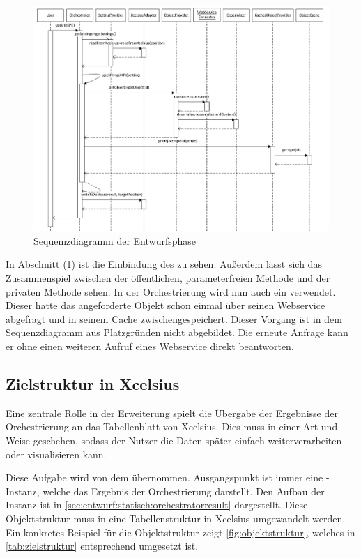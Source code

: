 \begin{onehalfspacing}
\begin{figure}[h]
\centering
\setlength{\unitlength}{1mm}
\includegraphics[width=15cm]{Visio/Entwurf-Sequenz.pdf}
\caption{Sequemzdiagramm der Entwurfsphase\label{fig:sequenz_entwurf}}
\end{figure} 

In Abschnitt (1) ist die Einbindung des  zu sehen. Außerdem lässt sich das Zusammenspiel zwischen der öffentlichen, parameterfreien Methode  und der privaten Methode  sehen. In der Orchestrierung wird nun auch ein  verwendet. Dieser hatte das angeforderte Objekt schon einmal über seinen Webservice abgefragt und in seinem Cache zwischengespeichert. Dieser Vorgang ist in dem Sequenzdiagramm aus Platzgründen nicht abgebildet. Die erneute Anfrage kann er ohne einen weiteren Aufruf eines Webservice direkt beantworten.

\subsection{Zielstruktur in \gls{Xcelsius}}
Eine zentrale Rolle in der Erweiterung spielt die Übergabe der Ergebnisse der Orchestrierung an das Tabellenblatt von \gls{Xcelsius}. Dies muss in einer Art und Weise geschehen, sodass der Nutzer die Daten später einfach weiterverarbeiten oder visualisieren kann.

Diese Aufgabe wird von dem  übernommen. Ausgangspunkt ist immer eine -Instanz, welche das Ergebnis der Orchestrierung darstellt. Den Aufbau der Instanz ist in \vref{sec:entwurf:statisch:orchestratorresult} dargestellt. Diese Objektstruktur muss in eine Tabellenstruktur in \gls{Xcelsius} umgewandelt werden. Ein konkretes Beispiel für die Objektstruktur zeigt \vref{fig:objektstruktur}, welches in \vref{tab:zielstruktur} entsprechend umgesetzt ist.


\end{onehalfspacing}
